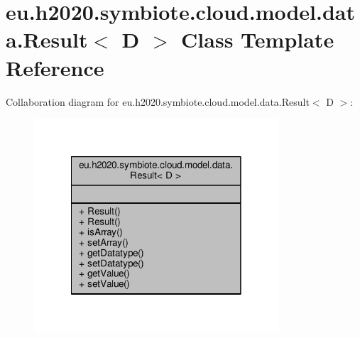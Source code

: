 \hypertarget{classeu_1_1h2020_1_1symbiote_1_1cloud_1_1model_1_1data_1_1Result}{}\section{eu.\+h2020.\+symbiote.\+cloud.\+model.\+data.\+Result$<$ D $>$ Class Template Reference}
\label{classeu_1_1h2020_1_1symbiote_1_1cloud_1_1model_1_1data_1_1Result}


Collaboration diagram for eu.\+h2020.\+symbiote.\+cloud.\+model.\+data.\+Result$<$ D $>$\+:\nopagebreak
\begin{figure}[H]
\begin{center}
\leavevmode
\includegraphics[width=258pt]{classeu_1_1h2020_1_1symbiote_1_1cloud_1_1model_1_1data_1_1Result__coll__graph}
\end{center}
\end{figure}
